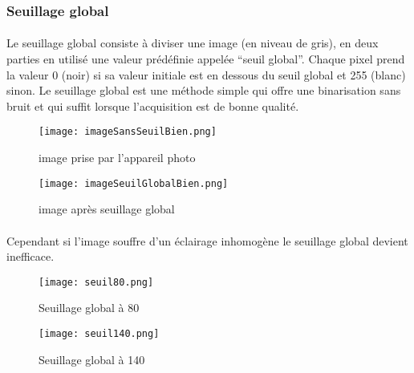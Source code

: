 \documentclass[a4paper]{article}
\begin{document}
				\subsubsection{Seuillage global}
				
				\paragraph{} Le seuillage global consiste à diviser une image (en niveau de gris), en deux parties en utilisé une valeur prédéfinie appelée “seuil global”. Chaque pixel prend la valeur 0 (noir) si sa valeur initiale est en dessous du seuil global et 255 (blanc) sinon.
				 \newpage Le seuillage global est une méthode simple qui offre une binarisation sans bruit et qui suffit lorsque l'acquisition est de bonne qualité.\nopagebreak
				
				
				\begin{figure}[H]
					\centering
					\begin{minipage}{.5\textwidth}
					  \centering
					  \texttt{[image: imageSansSeuilBien.png]}
					  \caption{image prise par l'appareil photo}
					  \label{fig:imageSansSeuilGlobal}
					\end{minipage}%
					\begin{minipage}{.5\textwidth}
					  \centering
					  \texttt{[image: imageSeuilGlobalBien.png]}
					  \caption{image après seuillage global }
					  \label{fig:imageSeuilGlobalBien}
					\end{minipage}
				\end{figure}


				\paragraph{} Cependant si l'image souffre d'un éclairage inhomogène le seuillage global devient inefficace. 
				

				\vspace*{1cm}
				\begin{figure}[h!]
					\centering
					\begin{minipage}{.5\textwidth}
					  \centering
					  \texttt{[image: seuil80.png]}
					  \caption{Seuillage global à 80}
					  \label{fig:imageSeuilGlobal80}
					\end{minipage}%
					\begin{minipage}{.5\textwidth}
					  \centering
					  \texttt{[image: seuil140.png]}
					  \caption{Seuillage global à 140 }
					  \label{fig:imageSeuilGlobal140}
					\end{minipage}
				\end{figure}
\end{document}
